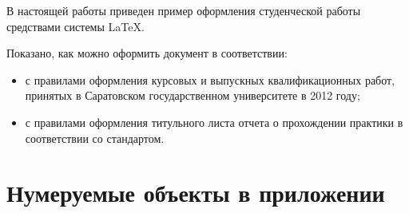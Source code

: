 \documentclass[bachelor, och, pract]{SCWorks}
\begin{document}
\newpage

\conclusion
В настоящей работы приведен пример оформления студенческой работы средствами системы \LaTeX.

Показано, как можно оформить документ в соответствии:
\begin{itemize}
    \item с правилами оформления курсовых и выпускных квалификационных работ, принятых в Саратовском государственном университете в 2012 году;
    \item с правилами оформления титульного листа отчета о прохождении практики в соответствии со стандартом.
\end{itemize}


%

%



\appendix

\section{Нумеруемые объекты в приложении}
\end{document}
